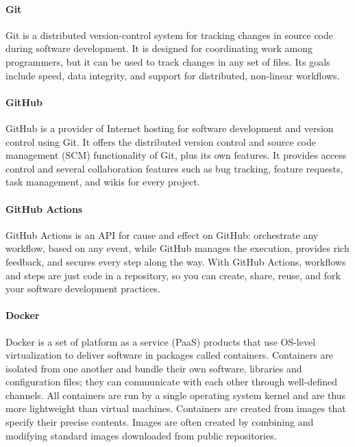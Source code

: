 \paragraph{Git}
Git is a distributed version-control system for tracking changes in source code during software development.
It is designed for coordinating work among programmers, but it can be used to track changes in any set of files.
Its goals include speed, data integrity, and support for distributed, non-linear workflows.

\paragraph{GitHub}
GitHub is a provider of Internet hosting for software development and version control using Git.
It offers the distributed version control and source code management (SCM) functionality of Git,
plus its own features.
It provides access control and several collaboration features such as bug tracking, feature requests, task management, and wikis for every project.

\paragraph{GitHub Actions}
GitHub Actions is an API for cause and effect on GitHub: orchestrate any workflow, based on any event, 
while GitHub manages the execution, provides rich feedback, and secures every step along the way.
With GitHub Actions, workflows and steps are just code in a repository, so you can create, share, reuse, and fork your software development practices.

\paragraph{Docker}
Docker is a set of platform as a service (PaaS) products that use OS-level virtualization to deliver software in packages called containers.
Containers are isolated from one another and bundle their own software, libraries and configuration files;
they can communicate with each other through well-defined channels.
All containers are run by a single operating system kernel and are thus more lightweight than virtual machines.
Containers are created from images that specify their precise contents.
Images are often created by combining and modifying standard images downloaded from public repositories.
